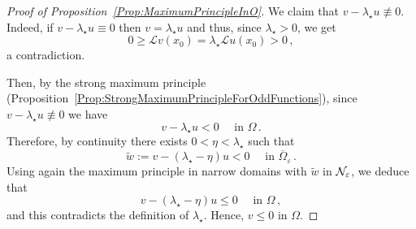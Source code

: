 \begin{proof}[Proof of Proposition~\ref{Prop:MaximumPrincipleInO}]
	We claim that $v - \lambda_\star u \not \equiv 0$. Indeed, if $v - \lambda_\star u \equiv 0$ then $v = \lambda_\star u$ and thus, since $\lambda_\star > 0$, we get
	$$
	0 \geq \mathscr{L} v(x_0) = \lambda_\star \mathscr{L} u(x_0) > 0\,,
	$$
	a contradiction.
	
	Then, by the strong maximum principle (Proposition~\ref{Prop:StrongMaximumPrincipleForOddFunctions}), since $v - \lambda_\star u \not \equiv 0$ we have
	$$
	v - \lambda_\star u < 0 \quad \textrm{ in }\Omega\,.
	$$
	Therefore, by continuity there exists $0 < \eta <\lambda_\star$ such that
	$$
	\tilde{w} := v - (\lambda_\star - \eta) u < 0 \quad \textrm{ in }\overline{\Omega}_\varepsilon\,.
	$$
	Using again the maximum principle in narrow domains with $\tilde{w}$ in $\mathcal{N}_\varepsilon$, we deduce that
	$$
	v - (\lambda_\star - \eta) u \leq 0 \quad \textrm{ in }\Omega\,,
	$$
	and this contradicts the definition of $\lambda_\star$. Hence, $v\leq 0$ in $\Omega$.
\end{proof}
